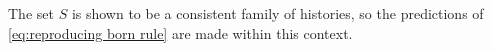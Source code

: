 The set $S$ is shown to be a consistent family of histories, so the predictions of \autoref{eq:reproducing born rule} are made within this context.
%
%
%

